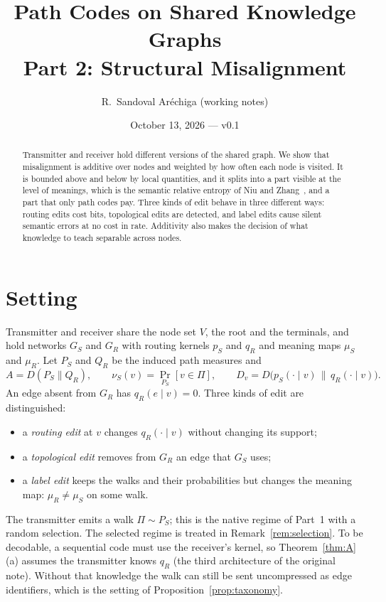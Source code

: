 \documentclass[11pt]{article}
\title{Path Codes on Shared Knowledge Graphs\\[2pt]\large Part 2: Structural Misalignment}
\author{R.~Sandoval Ar\'echiga (working notes)}
\date{October 13, 2026 --- v0.1}
\theoremstyle{definition}
\theoremstyle{remark}
\newcommand{\D}{D}
\begin{document}
\maketitle

\begin{abstract}
Transmitter and receiver hold different versions of the shared graph. We show that misalignment is additive over nodes and weighted by how often each node is visited. It is bounded above and below by local quantities, and it splits into a part visible at the level of meanings, which is the semantic relative entropy of Niu and Zhang~\cite{niu2025}, and a part that only path codes pay. Three kinds of edit behave in three different ways: routing edits cost bits, topological edits are detected, and label edits cause silent semantic errors at no cost in rate. Additivity also makes the decision of what knowledge to teach separable across nodes.
\end{abstract}

\section{Setting}

Transmitter and receiver share the node set $V$, the root and the terminals, and hold networks $G_S$ and $G_R$ with routing kernels $p_S$ and $q_R$ and meaning maps $\mu_S$ and $\mu_R$. Let $P_S$ and $Q_R$ be the induced path measures and
\[
A=\D(P_S\|Q_R),\qquad \nu_S(v)=\Pr_{P_S}[v\in\Pi],\qquad D_v=\D\bigl(p_S(\cdot\mid v)\,\|\,q_R(\cdot\mid v)\bigr).
\]
An edge absent from $G_R$ has $q_R(e\mid v)=0$. Three kinds of edit are distinguished:
\begin{itemize}
\item a \emph{routing edit} at $v$ changes $q_R(\cdot\mid v)$ without changing its support;
\item a \emph{topological edit} removes from $G_R$ an edge that $G_S$ uses;
\item a \emph{label edit} keeps the walks and their probabilities but changes the meaning map: $\mu_R\neq\mu_S$ on some walk.
\end{itemize}
The transmitter emits a walk $\Pi\sim P_S$; this is the native regime of Part~1 with a random selection. The selected regime is treated in Remark~\ref{rem:selection}. To be decodable, a sequential code must use the receiver's kernel, so Theorem~\ref{thm:A}(a) assumes the transmitter knows $q_R$ (the third architecture of the original note). Without that knowledge the walk can still be sent uncompressed as edge identifiers, which is the setting of Proposition~\ref{prop:taxonomy}.
\end{document}
